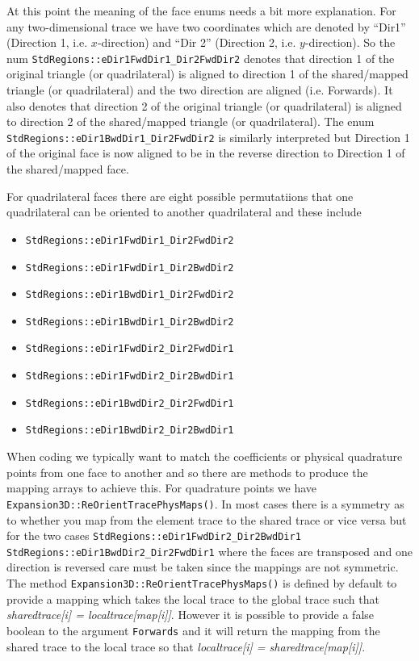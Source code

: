 At this point the meaning of the face enums needs a bit more
explanation. For any two-dimensional trace we have two coordinates
which are denoted by ``Dir1'' (Direction 1, i.e. $x$-direction) and
``Dir 2'' (Direction 2, i.e. $y$-direction). So the num
\verb+StdRegions::eDir1FwdDir1_Dir2FwdDir2+ denotes that direction 1
of the original triangle (or quadrilateral) is aligned to direction 1
of the shared/mapped triangle (or quadrilateral) and the two direction
are aligned (i.e. Forwards). It also denotes that direction 2 of the
original triangle (or quadrilateral) is aligned to direction 2 of the
shared/mapped triangle (or quadrilateral). The enum
\verb+StdRegions::eDir1BwdDir1_Dir2FwdDir2+ is similarly interpreted
but Direction 1 of the original face is now aligned to be in the
reverse direction to Direction 1 of the shared/mapped face.

For quadrilateral faces there are eight possible permutatiions that
one quadrilateral can be oriented to another quadrilateral and these include
\begin{itemize}
\item \verb+StdRegions::eDir1FwdDir1_Dir2FwdDir2+
\item \verb+StdRegions::eDir1FwdDir1_Dir2BwdDir2+
\item \verb+StdRegions::eDir1BwdDir1_Dir2FwdDir2+
\item \verb+StdRegions::eDir1BwdDir1_Dir2BwdDir2+
\item \verb+StdRegions::eDir1FwdDir2_Dir2FwdDir1+
\item \verb+StdRegions::eDir1FwdDir2_Dir2BwdDir1+
\item \verb+StdRegions::eDir1BwdDir2_Dir2FwdDir1+
\item \verb+StdRegions::eDir1BwdDir2_Dir2BwdDir1+
\end{itemize}

When coding we typically want to match the coefficients or physical
quadrature points from one face to another and so there are methods to
produce the mapping arrays to achieve this. For quadrature points we
have \verb+Expansion3D::ReOrientTracePhysMaps()+. In most cases there
is a symmetry as to whether you map from the element trace to the
shared trace or vice versa but for the two cases
\verb+StdRegions::eDir1FwdDir2_Dir2BwdDir1+
\verb+StdRegions::eDir1BwdDir2_Dir2FwdDir1+ where the faces are
transposed and one direction is reversed care must be taken since the
mappings are not symmetric. The method
\verb+Expansion3D::ReOrientTracePhysMaps()+ is defined by default to
provide a mapping which takes the local trace to the global trace such
that {\em sharedtrace[i] = localtrace[map[i]]}. However it is
possible to provide a false boolean to the argument \verb+Forwards+
and it will return the mapping from the shared trace to the local
trace so that {\em localtrace[i] = sharedtrace[map[i]]}. 


